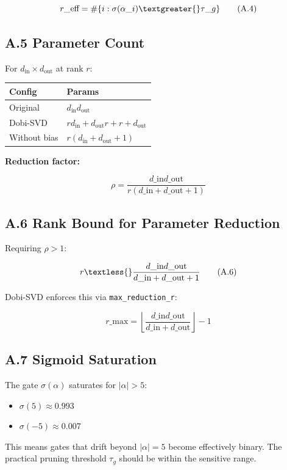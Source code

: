 \[
r\_\text{eff} = \#\{i : \sigma(\alpha\_i) \textgreater{} \tau\_g\}
\tag{A.4}
\]

\subsection{A.5 Parameter Count}

For $d_\text{in} \times d_\text{out}$ at rank $r$:

\begin{table}[H]
\centering
\small
\begin{tabular}{ll}
\toprule
\textbf{Config} & \textbf{Params} \\
\midrule
Original & $d_\text{in} d_\text{out}$ \\
Dobi-SVD & $r d_\text{in} + d_\text{out} r + r + d_\text{out}$ \\
Without bias & $r(d_\text{in} + d_\text{out} + 1)$ \\
\bottomrule
\end{tabular}
\end{table}

\textbf{Reduction factor:}

\[
\rho = \frac{d\_\text{in} d\_\text{out}}{r(d\_\text{in} + d\_\text{out} + 1)}
\tag{A.5}
\]

\subsection{A.6 Rank Bound for Parameter Reduction}

Requiring $\rho > 1$:

\[
r \textless{} \frac{d\_\text{in} d\_\text{out}}{d\_\text{in} + d\_\text{out} + 1}
\tag{A.6}
\]

Dobi-SVD enforces this via \texttt{max\_reduction\_r}:

\[
r\_\text{max} = \left\lfloor \frac{d\_\text{in} d\_\text{out}}{d\_\text{in} + d\_\text{out}} \right\rfloor - 1
\tag{A.7}
\]

\subsection{A.7 Sigmoid Saturation}

The gate $\sigma(\alpha)$ saturates for $|\alpha| > 5$:

\begin{itemize}
\item $\sigma(5) \approx 0.993$
\item $\sigma(-5) \approx 0.007$

\end{itemize}
This means gates that drift beyond $|\alpha| = 5$ become effectively binary. 
The practical pruning threshold $\tau_g$ should be within the sensitive range.

